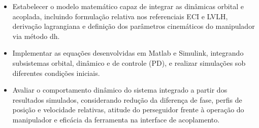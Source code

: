 \begin{itemize}
    \item Estabelecer o modelo matemático capaz de integrar as dinâmicas orbital e acoplada, incluindo formulação relativa nos referenciais ECI e LVLH, derivação lagrangiana e definição dos parâmetros cinemáticos do manipulador via método \gls{dh}.
    \item Implementar as equações desenvolvidas em Matlab e Simulink, integrando subsistemas orbital, dinâmico e de controle (PD), e realizar simulações sob diferentes condições iniciais.
    \item Avaliar o comportamento dinâmico do sistema integrado a partir dos resultados simulados, considerando redução da diferença de fase, perfis de posição e velocidade relativas, atitude do perseguidor frente à operação do manipulador e eficácia da ferramenta na interface de acoplamento.
\end{itemize}
